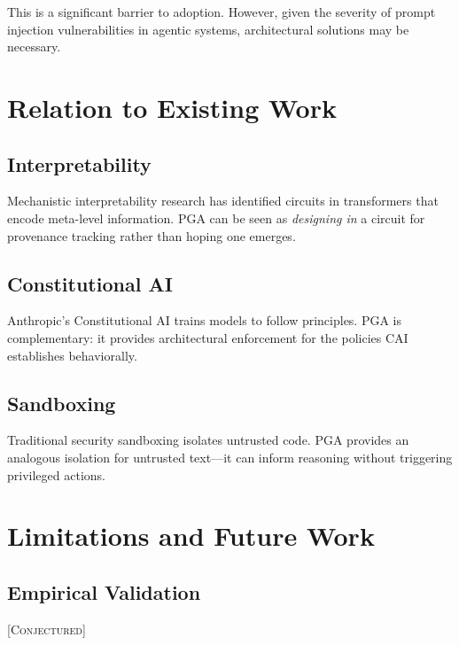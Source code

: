 \documentclass[11pt,a4paper]{article}
\theoremstyle{plain}
\theoremstyle{definition}
\theoremstyle{remark}
\newcommand{\conjectured}{\textsc{[Conjectured]}}
\begin{document}
This is a significant barrier to adoption. However, given the severity of prompt injection vulnerabilities in agentic systems, architectural solutions may be necessary.

\section{Relation to Existing Work}

\subsection{Interpretability}

Mechanistic interpretability research has identified circuits in transformers that encode meta-level information. PGA can be seen as \emph{designing in} a circuit for provenance tracking rather than hoping one emerges.

\subsection{Constitutional AI}

Anthropic's Constitutional AI trains models to follow principles. PGA is complementary: it provides architectural enforcement for the policies CAI establishes behaviorally.

\subsection{Sandboxing}

Traditional security sandboxing isolates untrusted code. PGA provides an analogous isolation for untrusted text---it can inform reasoning without triggering privileged actions.

\section{Limitations and Future Work}

\subsection{Empirical Validation} \conjectured
\end{document}
